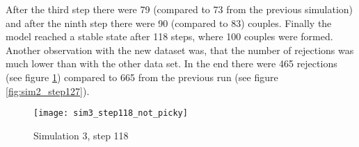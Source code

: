 After the third step there were 79 (compared to 73 from the previous simulation) and after the ninth step there were 90 (compared to 83) couples.
Finally the model reached a stable state after 118 steps, where 100 couples were formed.
Another observation with the new dataset was, that the number of rejections was much lower than with the other data set. 
In the end there were 465 rejections (see figure \ref{fig:sim3_step118_not_picky}) compared to 665 from the previous run (see figure \ref{fig:sim2_step127}).
\begin{figure}[H]
  \centering
  \texttt{[image: sim3\_step118\_not\_picky]}
	\caption{Simulation 3, step 118}
	\label{fig:sim3_step118_not_picky}
\end{figure}
